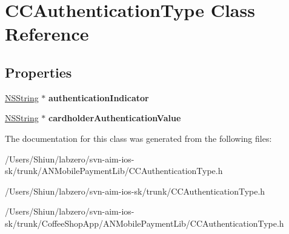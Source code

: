 \hypertarget{interface_c_c_authentication_type}{
\section{CCAuthenticationType Class Reference}
\label{interface_c_c_authentication_type}
}
\subsection*{Properties}
\begin{DoxyCompactItemize}
\item 
\hypertarget{interface_c_c_authentication_type_a540041dc9b911c3f769a054f2bac07ac}{
\hyperlink{class_n_s_string}{NSString} $\ast$ {\bfseries authenticationIndicator}}
\label{interface_c_c_authentication_type_a540041dc9b911c3f769a054f2bac07ac}

\item 
\hypertarget{interface_c_c_authentication_type_aab274434b793a2b977b0f6bc6a81bc76}{
\hyperlink{class_n_s_string}{NSString} $\ast$ {\bfseries cardholderAuthenticationValue}}
\label{interface_c_c_authentication_type_aab274434b793a2b977b0f6bc6a81bc76}

\end{DoxyCompactItemize}


The documentation for this class was generated from the following files:\begin{DoxyCompactItemize}
\item 
/Users/Shiun/labzero/svn-\/aim-\/ios-\/sk/trunk/ANMobilePaymentLib/CCAuthenticationType.h\item 
/Users/Shiun/labzero/svn-\/aim-\/ios-\/sk/trunk/CCAuthenticationType.h\item 
/Users/Shiun/labzero/svn-\/aim-\/ios-\/sk/trunk/CoffeeShopApp/ANMobilePaymentLib/CCAuthenticationType.h\end{DoxyCompactItemize}
